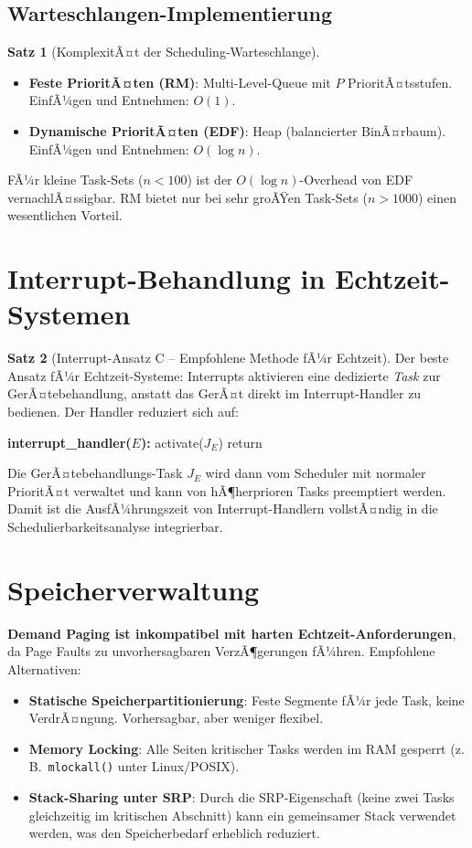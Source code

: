 ﻿\documentclass[a4paper,12pt]{report}
\theoremstyle{definition}
\newtheorem{satz}{Satz}[chapter]
\begin{document}
\subsection{Warteschlangen-Implementierung}

\begin{satz}[KomplexitÃ¤t der Scheduling-Warteschlange]
	\begin{itemize}
		\item \textbf{Feste PrioritÃ¤ten (RM)}: Multi-Level-Queue mit $P$ PrioritÃ¤tsstufen.
		      EinfÃ¼gen und Entnehmen: $O(1)$.
		\item \textbf{Dynamische PrioritÃ¤ten (EDF)}: Heap (balancierter BinÃ¤rbaum).
		      EinfÃ¼gen und Entnehmen: $O(\log n)$.
	\end{itemize}
	FÃ¼r kleine Task-Sets ($n < 100$) ist der $O(\log n)$-Overhead von EDF
	vernachlÃ¤ssigbar. RM bietet nur bei sehr groÃŸen Task-Sets ($n > 1000$) einen
	wesentlichen Vorteil.
\end{satz}

\section{Interrupt-Behandlung in Echtzeit-Systemen}

\begin{satz}[Interrupt-Ansatz C -- Empfohlene Methode fÃ¼r Echtzeit]
	Der beste Ansatz fÃ¼r Echtzeit-Systeme: Interrupts aktivieren eine dedizierte
	\emph{Task} zur GerÃ¤tebehandlung, anstatt das GerÃ¤t direkt im Interrupt-Handler
	zu bedienen. Der Handler reduziert sich auf:
	\begin{algorithmic}[1]
		\State \textbf{interrupt\_handler($E$):}
		\State activate($J_E$) 
		\State return
	\end{algorithmic}
	Die GerÃ¤tebehandlungs-Task $J_E$ wird dann vom Scheduler mit normaler PrioritÃ¤t
	verwaltet und kann von hÃ¶herprioren Tasks preemptiert werden. Damit ist die
	AusfÃ¼hrungszeit von Interrupt-Handlern vollstÃ¤ndig in die Schedulierbarkeitsanalyse
	integrierbar.
\end{satz}

\section{Speicherverwaltung}

\textbf{Demand Paging ist inkompatibel mit harten Echtzeit-Anforderungen},
da Page Faults zu unvorhersagbaren VerzÃ¶gerungen fÃ¼hren. Empfohlene Alternativen:
\begin{itemize}
	\item \textbf{Statische Speicherpartitionierung}: Feste Segmente fÃ¼r jede Task,
	      keine VerdrÃ¤ngung. Vorhersagbar, aber weniger flexibel.
	\item \textbf{Memory Locking}: Alle Seiten kritischer Tasks werden im RAM gesperrt
	      (z.\,B.\ \texttt{mlockall()} unter Linux/POSIX).
	\item \textbf{Stack-Sharing unter SRP}: Durch die SRP-Eigenschaft (keine zwei Tasks
	      gleichzeitig im kritischen Abschnitt) kann ein gemeinsamer Stack verwendet
	      werden, was den Speicherbedarf erheblich reduziert.
\end{itemize}
\end{document}
